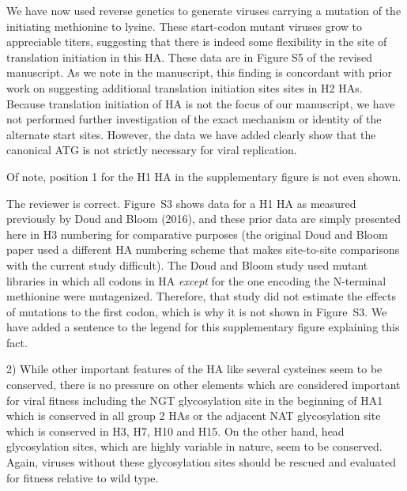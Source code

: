 \documentclass[11pt, oneside]{article}   	%
\newcommand{\response}[1]{{\color{black}#1}}
\begin{document}
\response{
We have now used reverse genetics to generate viruses carrying a mutation of the initiating methionine to lysine.
These start-codon mutant viruses grow to appreciable titers, suggesting that there is indeed some flexibility in the site of translation initiation in this HA.
These data are in Figure S5 of the revised manuscript.
As we note in the manuscript, this finding is concordant with prior work on suggesting additional translation initiation sites sites in H2 HAs.
Because translation initiation of HA is not the focus of our manuscript, we have not performed further investigation of the exact mechanism or identity of the alternate start sites.
However, the data we have added clearly show that the canonical ATG is not strictly necessary for viral replication.
}

Of note, position 1 for the H1 HA in the supplementary figure is not even shown. 

\response{
The reviewer is correct. 
Figure~S3 shows data for a H1 HA as measured previously by Doud and Bloom (2016), and these prior data are simply presented here in H3 numbering for comparative purposes (the original Doud and Bloom paper used a different HA numbering scheme that makes site-to-site comparisons with the current study difficult). 
The Doud and Bloom study used mutant libraries in which all codons in HA \emph{except} for the one encoding the N-terminal methionine were mutagenized.
Therefore, that study did not estimate the effects of mutations to the first codon, which is why it is not shown in Figure~S3.
We have added a sentence to the legend for this supplementary figure explaining this fact.
}

2) While other important features of the HA like several cysteines seem to be conserved, there is no pressure on other elements which are considered important for viral fitness including the NGT glycosylation site in the beginning of HA1 which is conserved in all group 2 HAs or the adjacent NAT glycosylation site which is conserved in H3, H7, H10 and H15. On the other hand, head glycosylation sites, which are highly variable in nature, seem to be conserved. Again, viruses without these glycosylation sites should be rescued and evaluated for fitness relative to wild type. 
\end{document}
